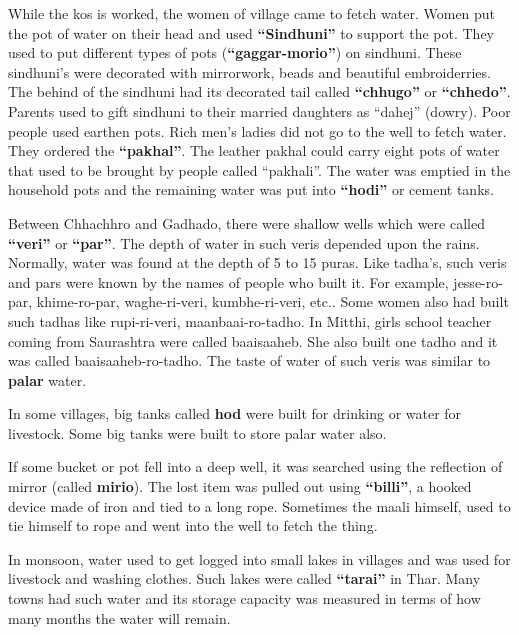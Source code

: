 While the kos is worked, the women of village came to fetch water. Women put the pot of water on their head and used \textbf{``Sindhuni''} to support the pot. They used to put different types of pots (\textbf{``gaggar-morio''}) on sindhuni. These sindhuni's were decorated with mirrorwork, beads and beautiful embroiderries. The behind of the sindhuni had its decorated tail called \textbf{``chhugo''} or \textbf{``chhedo''}. Parents used to gift sindhuni to their married daughters as ``dahej'' (dowry). Poor people used earthen pots. Rich men's ladies did not go to the well to fetch water. They ordered the \textbf{``pakhal''}. The leather pakhal could carry eight pots of water that used to be brought by people called ``pakhali''. The water was emptied in the household pots and the remaining water was put into \textbf{``hodi''} or cement tanks.

Between Chhachhro and Gadhado, there were shallow wells which were called \textbf{``veri''} or \textbf{``par''}. The depth of water in such veris depended upon the rains. Normally, water was found at the depth of 5 to 15 puras. Like tadha's, such veris and pars were known by the names of people who built it. For example, jesse-ro-par, khime-ro-par, waghe-ri-veri, kumbhe-ri-veri, etc.. Some women also had built such tadhas like rupi-ri-veri, maanbaai-ro-tadho. In Mitthi, girls school teacher coming from Saurashtra were called baaisaaheb. She also built one tadho and it was called baaisaaheb-ro-tadho. The taste of water of such veris was similar to \textbf{palar} water.

In some villages, big tanks called \textbf{hod} were built for drinking or water for livestock. Some big tanks were built to store palar water also.

If some bucket or pot fell into a deep well, it was searched using the reflection of mirror (called \textbf{mirio}). The lost item was pulled out using \textbf{``billi''}, a hooked device made of iron and tied to a long rope. Sometimes the maali himself, used to tie himself to rope and went into the well to fetch the thing.

In monsoon, water used to get logged into small lakes in villages and was used for livestock and washing clothes. Such lakes were called \textbf{``tarai''} in Thar. Many towns had such water and its storage capacity was measured in terms of how many months the water will remain.

